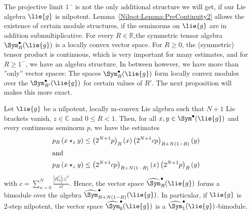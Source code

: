 The projective limit $1^-$ is not the only additional structure we will get, if 
our Lie algebra $\lie{g}$ is nilpotent. Lemma~\ref{Nilpot:Lemma:PreContinuity2} 
allows the existence of certain module structures, if the seminorms on 
$\lie{g}$ are in addition submultiplicative. For every $R \in \mathbb{R}$,the 
symmetric tensor algebra $\Sym_R^{\bullet}(\lie{g})$ is a locally convex vector 
space. For $R \geq 0$, the (symmetric) tensor product is continuous, which is 
very important for many estimates, and for $R \geq 1^-$, we have an algebra 
structure. In between however, we have more than ''only'' vector spaces: The 
spaces $\Sym_R^{\bullet}(\lie{g})$ form locally convex modules over the 
$\Sym_{R'}^{\bullet}(\lie{g})$ for certain values of $R'$. The next proposition 
will makes this more exact.
\begin{proposition}
	\label{Nilpot:Prop:Bimodules}
	Let $\lie{g}$ be a nilpotent, locally m-convex Lie algebra such that 
	$N + 1$ 	Lie brackets vanish, $z \in 	\mathbb{C}$ and $0 \leq R < 1$. 
	Then, for all $x, y \in \Sym^{\bullet}(\lie{g})$ and every continuous 
	seminorm $p$, we have the estimates
	\begin{align}
		\label{Nilpot:BimoduleEstimate1}
		p_R \left(
			x \star_z y
		\right)
		& \leq
		\left(2^{N + 1} p\right)_R(x) 
		\left(2^{N + 1} c p\right)_{R + N(1-R)}(y)
		\\
	\intertext{and}
		\label{Nilpot:BimoduleEstimate2}
		p_R \left(
			x \star_z y
		\right)
		& \leq
		\left(2^{N + 1} c p\right)_{R + N(1-R)}(x)
		\left(2^{N + 1} p\right)_R(y) 
	\end{align}
	with $c = \sum_{n = 0}^N \frac{|B_n^*| |z|^n}{n!}$.
	Hence, the vector space $\widehat{\Sym}_R^{\bullet}
	(\lie{g})$ forms a bimodule over the algebra $\widehat{\Sym}_{R + N(1-
	R)}^{\bullet}(\lie{g})$. In particular, if $\lie{g}$ is 2-step nilpotent, 
	the vector space $\widehat{\Sym}_0^{\bullet}(\lie{g})$ is a 
	$\widehat{\Sym}_1^{\bullet}(\lie{g})$-bimodule.
\end{proposition}
